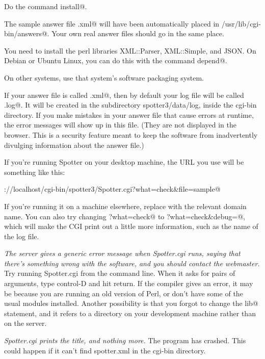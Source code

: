 \documentclass{doc}
\begin{document}
Do the command \verb@make install@.

The sample answer file \verb@sample.xml@ will have been automatically placed in
\verb@/usr/lib/cgi-bin/answers@. Your own real answer files should go in the same
place.

You need to install the perl libraries XML::Parser, XML::Simple, and JSON.
On Debian or Ubuntu Linux, you can do this with the command \verb@make depend@.

On other systems, use that system's software packaging system.


If your answer file is called \verb@spotter.xml@, then by default your log file will be
called \verb@spotter.log@. It will be created in the subdirectory spotter3/data/log, inside the
cgi-bin directory.
If you make mistakes in your answer file that cause errors at runtime, the error
messages will show up in this file. (They are not displayed in the browser. This
is a security feature meant to keep the software from inadvertently divulging
information about the answer file.)

If you're running Spotter on your desktop machine, the URL you use will be
something like this:

\noindent\verb@http://localhost/cgi-bin/spotter3/Spotter.cgi?what=check&file=sample@

If you're running it on a machine elsewhere, replace \verb@localhost@ with the
relevant domain name. You can also try changing \verb@?what=check@ to
\verb@?what=check&debug=@, which will make the CGI print out a little
more information, such as the name of the log file.

\emph{The server gives a generic error message when Spotter.cgi runs, saying
that there's something wrong with the software, and you should contact the
webmaster.} Try running Spotter.cgi from the command line. When it asks
for pairs of arguments, type control-D and hit return. If the compiler gives
an error, it may be because you are running an old version of Perl, or don't
have some of the usual modules installed. Another possibility is that you
forgot to change the \verb@use lib@ statement, and 
it refers to a directory on your development machine rather than on
the server.

\emph{Spotter.cgi prints the title, and nothing more.} The program has
crashed. This could happen if it can't find spotter.xml in the cgi-bin
directory.
\end{document}
